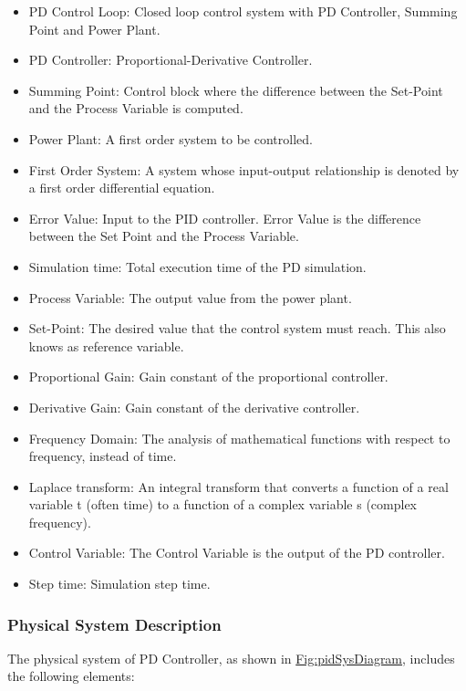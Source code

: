 \documentclass[12pt]{article}
\begin{document}
\begin{itemize}
\item{PD Control Loop: Closed loop control system with PD Controller, Summing Point and Power Plant.}
\item{PD Controller: Proportional-Derivative Controller.}
\item{Summing Point: Control block where the difference between the Set-Point and the Process Variable is computed.}
\item{Power Plant: A first order system to be controlled.}
\item{First Order System: A system whose input-output relationship is denoted by a first order differential equation.}
\item{Error Value: Input to the PID controller. Error Value is the difference between the Set Point and the Process Variable.}
\item{Simulation time: Total execution time of the PD simulation.}
\item{Process Variable: The output value from the power plant.}
\item{Set-Point: The desired value that the control system must reach. This also knows as reference variable.}
\item{Proportional Gain: Gain constant of the proportional controller.}
\item{Derivative Gain: Gain constant of the derivative controller.}
\item{Frequency Domain: The analysis of mathematical functions with respect to frequency, instead of time.}
\item{Laplace transform: An integral transform that converts a function of a real variable t (often time) to a function of a complex variable s (complex frequency).}
\item{Control Variable: The Control Variable is the output of the PD controller.}
\item{Step time: Simulation step time.}
\end{itemize}
\subsubsection{Physical System Description}
\label{Sec:PhysSyst}
The physical system of PD Controller, as shown in \hyperref[Figure:pidSysDiagram]{Fig:pidSysDiagram}, includes the following elements:
\end{document}
